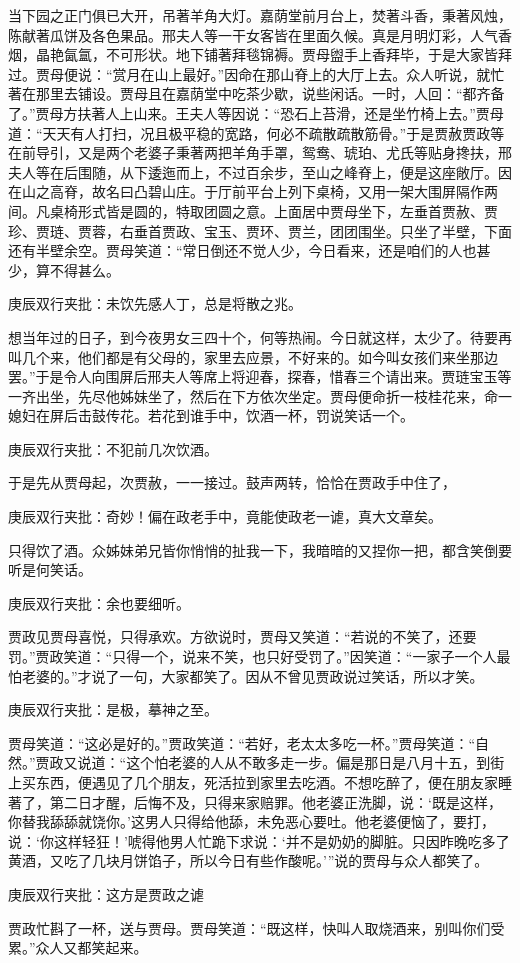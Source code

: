\begin{parag}
    当下园之正门俱已大开，吊著羊角大灯。嘉荫堂前月台上，焚著斗香，秉著风烛，陈献著瓜饼及各色果品。邢夫人等一干女客皆在里面久候。真是月明灯彩，人气香烟，晶艳氤氲，不可形状。地下铺著拜毯锦褥。贾母盥手上香拜毕，于是大家皆拜过。贾母便说：“赏月在山上最好。”因命在那山脊上的大厅上去。众人听说，就忙著在那里去铺设。贾母且在嘉荫堂中吃茶少歇，说些闲话。一时，人回：“都齐备了。”贾母方扶著人上山来。王夫人等因说：“恐石上苔滑，还是坐竹椅上去。”贾母道：“天天有人打扫，况且极平稳的宽路，何必不疏散疏散筋骨。”于是贾赦贾政等在前导引，又是两个老婆子秉著两把羊角手罩，鸳鸯、琥珀、尤氏等贴身搀扶，邢夫人等在后围随，从下逶迤而上，不过百余步，至山之峰脊上，便是这座敞厅。因在山之高脊，故名曰凸碧山庄。于厅前平台上列下桌椅，又用一架大围屏隔作两间。凡桌椅形式皆是圆的，特取团圆之意。上面居中贾母坐下，左垂首贾赦、贾珍、贾琏、贾蓉，右垂首贾政、宝玉、贾环、贾兰，团团围坐。只坐了半壁，下面还有半壁余空。贾母笑道：“常日倒还不觉人少，今日看来，还是咱们的人也甚少，算不得甚么。\begin{note}庚辰双行夹批：未饮先感人丁，总是将散之兆。\end{note}想当年过的日子，到今夜男女三四十个，何等热闹。今日就这样，太少了。待要再叫几个来，他们都是有父母的，家里去应景，不好来的。如今叫女孩们来坐那边罢。”于是令人向围屏后邢夫人等席上将迎春，探春，惜春三个请出来。贾琏宝玉等一齐出坐，先尽他姊妹坐了，然后在下方依次坐定。贾母便命折一枝桂花来，命一媳妇在屏后击鼓传花。若花到谁手中，饮酒一杯，罚说笑话一个。\begin{note}庚辰双行夹批：不犯前几次饮酒。\end{note}于是先从贾母起，次贾赦，一一接过。鼓声两转，恰恰在贾政手中住了，\begin{note}庚辰双行夹批：奇妙！偏在政老手中，竟能使政老一谑，真大文章矣。\end{note}只得饮了酒。众姊妹弟兄皆你悄悄的扯我一下，我暗暗的又捏你一把，都含笑倒要听是何笑话。\begin{note}庚辰双行夹批：余也要细听。\end{note}贾政见贾母喜悦，只得承欢。方欲说时，贾母又笑道：“若说的不笑了，还要罚。”贾政笑道：“只得一个，说来不笑，也只好受罚了。”因笑道：“一家子一个人最怕老婆的。”才说了一句，大家都笑了。因从不曾见贾政说过笑话，所以才笑。\begin{note}庚辰双行夹批：是极，摹神之至。\end{note}贾母笑道：“这必是好的。”贾政笑道：“若好，老太太多吃一杯。”贾母笑道：“自然。”贾政又说道：“这个怕老婆的人从不敢多走一步。偏是那日是八月十五，到街上买东西，便遇见了几个朋友，死活拉到家里去吃酒。不想吃醉了，便在朋友家睡著了，第二日才醒，后悔不及，只得来家赔罪。他老婆正洗脚，说：‘既是这样，你替我舔舔就饶你。’这男人只得给他舔，未免恶心要吐。他老婆便恼了，要打，说：‘你这样轻狂！’唬得他男人忙跪下求说：‘并不是奶奶的脚脏。只因昨晚吃多了黄酒，又吃了几块月饼馅子，所以今日有些作酸呢。’”说的贾母与众人都笑了。\begin{note}庚辰双行夹批：这方是贾政之谑\end{note}贾政忙斟了一杯，送与贾母。贾母笑道：“既这样，快叫人取烧酒来，别叫你们受累。”众人又都笑起来。
\end{parag}


